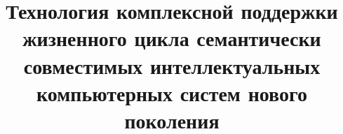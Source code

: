 \documentclass[graybox,envcountchap,sectrefs]{svmono}
\begin{document}
\author{}
\title{Технология комплексной поддержки жизненного цикла семантически совместимых интеллектуальных компьютерных систем нового поколения}
\maketitle

\frontmatter%

\tableofcontents





\mainmatter%

%

%















\end{document}
